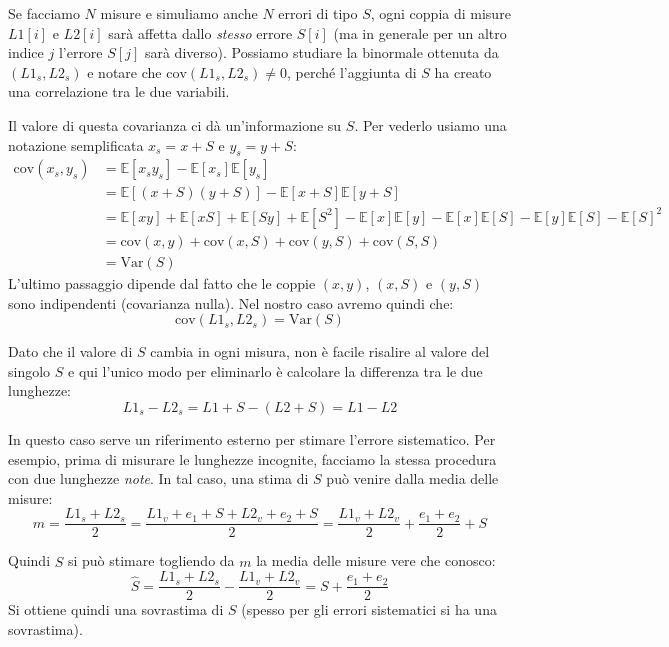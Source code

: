 \documentclass[openany,a4paper,12pt]{book}
\theoremstyle{remark}
\begin{document}
Se facciamo $N$ misure e simuliamo anche $N$ errori di tipo $S$, ogni coppia di misure $L1[i]$ e $L2[i]$ sarà affetta dallo \emph{stesso} errore $S[i]$ (ma in generale per un altro indice $j$ l'errore $S[j]$ sarà diverso).
Possiamo studiare la binormale ottenuta da $(L1_s, L2_s)$ e notare che $\text{cov}(L1_s, L2_s) \neq 0$, perché l'aggiunta di $S$ ha creato una correlazione tra le due variabili.

Il valore di questa covarianza ci dà un'informazione su $S$. Per vederlo usiamo una notazione semplificata $x_s = x + S$ e $y_s = y + S$:
\begin{align*}
\text{cov}(x_s, y_s) &= \mathbb{E}[x_s y_s] - \mathbb{E}[x_s]\mathbb{E}[y_s] \\
&= \mathbb{E}[(x+S)(y+S)] - \mathbb{E}[x+S]\mathbb{E}[y+S] \\
&= \mathbb{E}[xy] + \mathbb{E}[xS] + \mathbb{E}[Sy] + \mathbb{E}[S^2] - \mathbb{E}[x]\mathbb{E}[y] - \mathbb{E}[x]\mathbb{E}[S] - \mathbb{E}[y]\mathbb{E}[S] - \mathbb{E}[S]^2 \\
&= \text{cov}(x,y) + \text{cov}(x,S) + \text{cov}(y,S) + \text{cov}(S,S) \\
&= \text{Var}(S)
\end{align*}
L'ultimo passaggio dipende dal fatto che le coppie $(x,y)$, $(x,S)$ e $(y,S)$ sono indipendenti (covarianza nulla).
Nel nostro caso avremo quindi che:
\begin{equation}
\text{cov}(L1_s, L2_s) = \text{Var}(S)
\end{equation}

Dato che il valore di $S$ cambia in ogni misura, non è facile risalire al valore del singolo $S$ e qui l'unico modo per eliminarlo è calcolare la differenza tra le due lunghezze:
\begin{equation*}
L1_s - L2_s = L1 + S - (L2 + S) = L1 - L2
\end{equation*}

In questo caso serve un riferimento esterno per stimare l'errore sistematico. Per esempio, prima di misurare le lunghezze incognite, facciamo la stessa procedura con due lunghezze \emph{note}. In tal caso, una stima di $S$ può venire dalla media delle misure:
\begin{equation*}
m = \frac{L1_s + L2_s}{2} = \frac{L1_v + e_1 + S + L2_v + e_2 + S}{2} = \frac{L1_v + L2_v}{2} + \frac{e_1 + e_2}{2} + S
\end{equation*}

Quindi $\hat{S}$ si può stimare togliendo da $m$ la media delle misure vere che conosco:
\begin{equation}
\hat{S} = \frac{L1_s + L2_s}{2} - \frac{L1_v + L2_v}{2} = S + \frac{e_1 + e_2}{2}
\end{equation}
Si ottiene quindi una sovrastima di $S$ (spesso per gli errori sistematici si ha una sovrastima).
\end{document}
